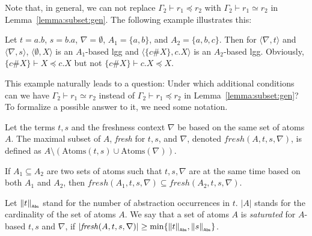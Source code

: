 \documentclass{llncs}
\newcommand{\np}[2]{\langle #1, \allowbreak #2\rangle}
\newcommand{\atoms}{\mathrm{Atoms}}
\newcommand{\abscard}[1]{\|#1\|_{_{\sf Abs}}}
\newcommand{\unused}{\mathit{fresh}}
\begin{document}
 Note that, in general, we can not replace $\Gamma_2\vdash r_1\preceq r_2$ with $\Gamma_2\vdash r_1\simeq r_2$ in Lemma~\ref{lemma:subset:gen}. The following example
 illustrates this:
 \begin{example}
  \label{exmp:subset:gen}
   Let $t = a.b$, $s= b.a$, $\nabla =\emptyset$, $A_1=\{a,b\}$, and
   $A_2=\{a,b,c\}$. Then for $\np{\nabla}{t}$ and $\np{\nabla}{s}$,
   $\np{\emptyset}{X}$ is an $A_1$-based lgg and $\np{\{c\#X\}}{c.X}$
   is an $A_2$-based lgg. Obviously, $\{c\#X\} \vdash X \preceq c.X$ but not $\{c\#X\} \vdash c.X \preceq X$.
 \end{example}

This example naturally leads to a question: Under which additional conditions can we have $\Gamma_2\vdash r_1\simeq r_2$ instead of $\Gamma_2\vdash r_1\preceq r_2$ in Lemma~\ref{lemma:subset:gen}? To formalize a possible answer to it, we need some notation.

Let the terms $t,s$ and the freshness context $\nabla$ be based on the same set of atoms $A$. The maximal subset of $A$, \emph{fresh} for $t,s$, and $\nabla$, denoted $\unused(A,t,s,\nabla)$, is defined as $A\setminus (\atoms(t,s) \cup \atoms(\nabla))$.


If $A_1\subseteq A_2$ are two sets of atoms such that $t,s,\nabla$ are at the same time based on both $A_1$ and $A_2$, then $\unused(A_1,t,s,\nabla)\subseteq \unused(A_2,t,s,\nabla)$.

Let $\abscard{t}$ stand for the number of abstraction occurrences in
$t$. $|A|$ stands for the cardinality of the set of atoms $A$. We say that a set of atoms $A$ is \emph{saturated} for $A$-based $t,s$ and $\nabla$, if $|\unused(A,t,s,\nabla)|\ge \min\{\abscard{t},\abscard{s}\}$.
\end{document}

